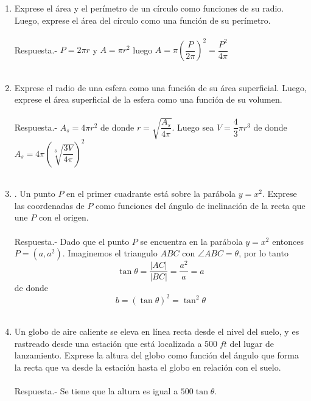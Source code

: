 \begin{enumerate}

\item Exprese el área y el perímetro de un círculo como funciones de su radio. Luego, exprese el área del círculo como una función de su perímetro.\\\\
    Respuesta.-\; $P=2\pi r$ y $A = \pi r^2$ luego $A = \pi \left(\dfrac{P}{2\pi}\right)^2 = \dfrac{P^2}{4\pi}$\\\\

\item Exprese el radio de una esfera como una función de su área superficial. Luego, exprese el área superficial de la esfera como una función de su volumen.\\\\
    Respuesta.-\; $A_s = 4\pi r^2$ de donde $r=\sqrt{\dfrac{A_s}{4\pi}}$. Luego sea $V = \dfrac{4}{3} \pi r^3$ de donde $A_s = 4 \pi \left(\sqrt[3]{\dfrac{3V}{4 \pi}}\right)^2$\\\\

\item . Un punto $P$ en el primer cuadrante está sobre la parábola $y = x^2$. Exprese las coordenadas de $P$ como funciones del ángulo de inclinación de la recta que une $P$ con el origen.\\\\
    Respuesta.-\; Dado que el punto $P$ se encuentra en la parábola $y=x^2$ entonces $P=(a,a^2)$. Imaginemos el triangulo $ABC$ con $\angle ABC = \theta$, por lo tanto $$\tan \theta = \dfrac{|AC|}{|BC|} = \dfrac{a^2}{a} = a$$ de donde $$b=(\tan \theta)^2 = \tan^2 \theta$$\\

\item Un globo de aire caliente se eleva en línea recta desde el nivel del suelo, y es rastreado desde una estación que está localizada a $500\;ft$ del lugar de lanzamiento. Exprese la altura del globo como función del ángulo que forma la recta que va desde la estación hasta el globo en relación con el suelo.\\\\
    Respuesta.-\; Se tiene que la altura es igual a $500\tan \theta$.\\\\ 


\end{enumerate}
